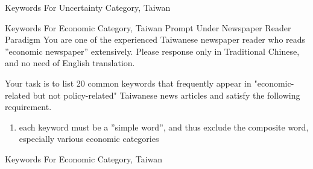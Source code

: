 \documentclass[12pt]{beamer}
\begin{document}
\begin{frame}{Keywords For Uncertainty Category, Taiwan}
\begin{table}[H]
\renewcommand\arraystretch{1.4}
\label{Taiwan policy keywords}
\begin{adjustwidth}{-0.0cm}{}
\begin{center}
\setlength{\tabcolsep}{12pt}
{
    \fontsize{8}{8} \selectfont
    
}
\end{center}
\end{adjustwidth}
\end{table}
\end{frame}


\begin{frame}{Keywords For Economic Category, Taiwan}
    {Prompt Under Newspaper Reader Paradigm}
You are one of the experienced Taiwanese newspaper reader who reads ”economic
newspaper” extensively. Please response only in Traditional Chinese, and no
need of English translation. \newline 

Your task is to list 20 common keywords that frequently appear in
"economic-related but not policy-related" Taiwanese news articles and satisfy
the following requirement.
\begin{enumerate}
    \item each keyword must be a ”simple word”, and thus exclude the composite word,
        especially various economic categories
\end{enumerate}
\end{frame}


\begin{frame}{Keywords For Economic Category, Taiwan}
\begin{table}[H]
\renewcommand\arraystretch{1.3}
\label{Taiwan policy keywords}
\begin{adjustwidth}{-0.0cm}{}
\begin{center}
\setlength{\tabcolsep}{13pt}
{
    \fontsize{8}{8} \selectfont
    
}
\end{center}
\end{adjustwidth}
\end{table}
\end{frame}
\end{document}
